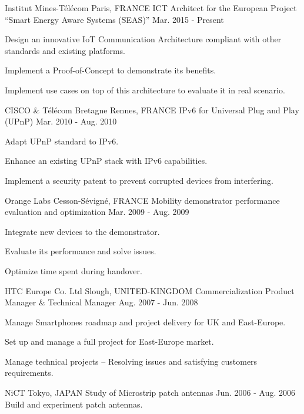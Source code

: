 \begin{cventries}
  \cventry
    {Institut Mines-T\'{e}l\'{e}com}
    {Paris, FRANCE}
    {ICT Architect for the European Project “Smart Energy Aware Systems (SEAS)” }
    {Mar. 2015 - Present}
    {
      \begin{cvitems}
        \item {Design an innovative IoT Communication Architecture compliant with other standards and existing platforms.}
        \item {Implement a Proof-of-Concept to demonstrate its benefits.}
        \item {Implement use cases on top of this architecture to evaluate it in real scenario.}
      \end{cvitems}
    }
  \cventry
    {CISCO \& T\'{e}l\'{e}com Bretagne}
    {Rennes, FRANCE}
    {IPv6 for Universal Plug and Play (UPnP)}
    {Mar. 2010 - Aug. 2010}
    {
      \begin{cvitems}
        \item {Adapt UPnP standard to IPv6.}
        \item {Enhance an existing UPnP stack with IPv6 capabilities.}
        \item {Implement a security patent to prevent corrupted devices from interfering.}
      \end{cvitems}
    }
  \cventry
    {Orange Labs}
    {Cesson-S\'{e}vign\'{e}, FRANCE}
    {Mobility demonstrator performance evaluation and optimization}
    {Mar. 2009 - Aug. 2009}
    {
      \begin{cvitems}
        \item {Integrate new devices to the demonstrator.}
        \item {Evaluate its performance and solve issues.}
        \item {Optimize time spent during handover.}
      \end{cvitems} 
    }
  \cventry
    {HTC Europe Co. Ltd}
    {Slough, UNITED-KINGDOM}
    {Commercialization Product Manager \& Technical Manager}
    {Aug. 2007 - Jun. 2008}
    {
      \begin{cvitems}
        \item {Manage Smartphones roadmap and project delivery for UK and East-Europe.}
        \item {Set up and manage a full project for East-Europe market.}
        \item {Manage technical projects -- Resolving issues and satisfying customers requirements.}
      \end{cvitems}
    }
  \cventry
    {NiCT}
    {Tokyo, JAPAN}
    {Study of Microstrip patch antennas}
    {Jun. 2006 - Aug. 2006}
    {\quad \quad Build and experiment patch antennas.}
  
\end{cventries}
